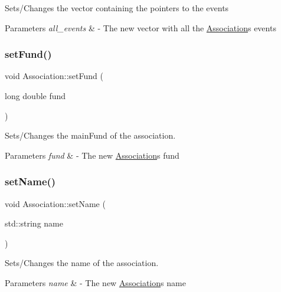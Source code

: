 Sets/\+Changes the vector containing the pointers to the events


\begin{DoxyParams}{Parameters}
{\em all\+\_\+events} & -\/ The new vector with all the \hyperlink{classAssociation}{Association}\textquotesingle{}s events \\
\hline
\end{DoxyParams}
\mbox{\label{classAssociation_acbeba5c80457ba1c307c212bcad08b82}} 
\subsubsection{\texorpdfstring{set\+Fund()}{setFund()}}
{\footnotesize\ttfamily void Association\+::set\+Fund (\begin{DoxyParamCaption}\item[{long double}]{fund }\end{DoxyParamCaption})}



Sets/\+Changes the main\+Fund of the association. 


\begin{DoxyParams}{Parameters}
{\em fund} & -\/ The new \hyperlink{classAssociation}{Association}\textquotesingle{}s fund \\
\hline
\end{DoxyParams}
\mbox{\label{classAssociation_a8bd23fd6c727963237bf85a6374ab6d8}} 
\subsubsection{\texorpdfstring{set\+Name()}{setName()}}
{\footnotesize\ttfamily void Association\+::set\+Name (\begin{DoxyParamCaption}\item[{std\+::string}]{name }\end{DoxyParamCaption})}



Sets/\+Changes the name of the association. 


\begin{DoxyParams}{Parameters}
{\em name} & -\/ The new \hyperlink{classAssociation}{Association}\textquotesingle{}s name \\
\hline
\end{DoxyParams}
\mbox{\label{classAssociation_afa9bdcebf905cddc52870dd156a14d54}} 
